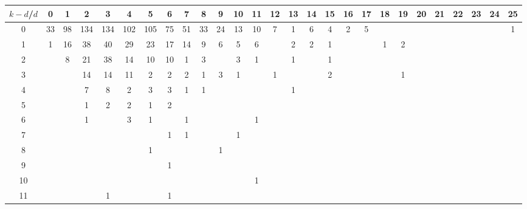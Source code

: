 \documentclass{article}[12pt]
\begin{document}
\begin{landscape}

\begin{table}[h]\footnotesize
{\centering
\begin{tabular}{|c|c|
c|c|c|c|c|c|c|c|c|c|c|c|c|c|c|c|c|c|c|c|c|c|c|c|c|}
  \hline
  $k-d$/$d$ 
 & 0 & 1 & 2 & 3 & 4 & 5 & 6 & 7 & 8 & 9 & 10 & 11 & 12 & 13 & 14 & 15 & 16 & 17 & 18 & 19 & 20 & 21 & 22 & 23 & 24 & 25\\

  \hline
  \hline

0  & 33 & 98 & 134 & 134 & 102 & 105 & 75 & 51 & 33 & 24 & 13 & 10 & 7 & 1 & 6 & 4 & 2 & 5 &  &  &  &  &  &  &  & 1\\

1  & 1 & 16 & 38 & 40 & 29 & 23 & 17 & 14 & 9 & 6 & 5 & 6 &  & 2 & 2 & 1 &  &  & 1 & 2 &  &  &  &  &  & \\

2  &  & 8 & 21 & 38 & 14 & 10 & 10 & 1 & 3 &  & 3 & 1 &  & 1 &  & 1 &  &  &  &  &  &  &  &  &  & \\

3  &  &  & 14 & 14 & 11 & 2 & 2 & 2 & 1 & 3 & 1 &  & 1 &  &  & 2 &  &  &  & 1 &  &  &  &  &  & \\

4  &  &  & 7 & 8 & 2 & 3 & 3 & 1 & 1 &  &  &  &  & 1 &  &  &  &  &  &  &  &  &  &  &  & \\

5  &  &  & 1 & 2 & 2 & 1 & 2 &  &  &  &  &  &  &  &  &  &  &  &  &  &  &  &  &  &  & \\

6  &  &  & 1 &  & 3 & 1 &  & 1 &  &  &  & 1 &  &  &  &  &  &  &  &  &  &  &  &  &  & \\

7  &  &  &  &  &  &  & 1 & 1 &  &  & 1 &  &  &  &  &  &  &  &  &  &  &  &  &  &  & \\

8  &  &  &  &  &  & 1 &  &  &  & 1 &  &  &  &  &  &  &  &  &  &  &  &  &  &  &  & \\

9  &  &  &  &  &  &  & 1 &  &  &  &  &  &  &  &  &  &  &  &  &  &  &  &  &  &  & \\

10  &  &  &  &  &  &  &  &  &  &  &  & 1 &  &  &  &  &  &  &  &  &  &  &  &  &  & \\

11  &  &  &  & 1 &  &  & 1 &  &  &  &  &  &  &  &  &  &  &  &  &  &  &  &  &  &  & \\


\end{tabular}}
\end{table}
\end{landscape}
\end{document}
